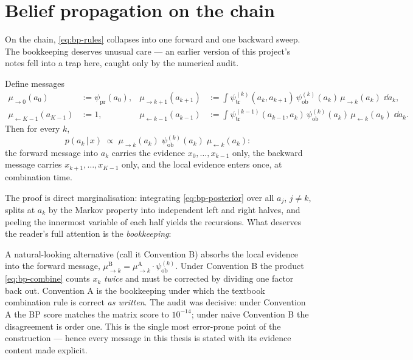 \section{Belief propagation on the chain}\label{sec:bp-chain}

On the chain, \eqref{eq:bp-rules} collapses into one forward and one
backward sweep. The bookkeeping deserves unusual care --- an earlier
version of this project's notes fell into a trap here, caught only by the
numerical audit.

\begin{proposition}[Convention A]\label{prop:bp-convA}
Define messages
\begin{align}
  \mu_{\to 0}(a_0) &:= \psi_{\mathrm{pr}}(a_0),
  &
  \mu_{\to k+1}(a_{k+1}) &:= \int
    \psi^{(k)}_{\mathrm{tr}}(a_k, a_{k+1})\,
    \psi^{(k)}_{\mathrm{ob}}(a_k)\,
    \mu_{\to k}(a_k)\; \dd a_k ,
  \label{eq:bp-fwd}\\
  \mu_{\leftarrow K-1}(a_{K-1}) &:= 1,
  &
  \mu_{\leftarrow k-1}(a_{k-1}) &:= \int
    \psi^{(k-1)}_{\mathrm{tr}}(a_{k-1}, a_k)\,
    \psi^{(k)}_{\mathrm{ob}}(a_k)\,
    \mu_{\leftarrow k}(a_k)\; \dd a_k .
  \label{eq:bp-bwd}
\end{align}
Then for every $k$,
\begin{equation}
  p(a_k \,|\, x) \;\propto\;
  \mu_{\to k}(a_k)\;
  \psi^{(k)}_{\mathrm{ob}}(a_k)\;
  \mu_{\leftarrow k}(a_k) :
  \label{eq:bp-combine}
\end{equation}
the forward message into $a_k$ carries the evidence $x_0, \dots, x_{k-1}$
only, the backward message carries $x_{k+1}, \dots, x_{K-1}$ only, and the
local evidence enters once, at combination time.
\end{proposition}

The proof is direct marginalisation: integrating \eqref{eq:bp-posterior}
over all $a_j$, $j \neq k$, splits at $a_k$ by the Markov property into
independent left and right halves, and peeling the innermost variable of
each half yields the recursions. What deserves the reader's full attention
is the \emph{bookkeeping}:

\begin{remark}\label{rmk:bp-trap}
A natural-looking alternative (call it Convention B) absorbs the local
evidence into the forward message,
$\mu^{\mathrm{B}}_{\to k} = \mu^{\mathrm{A}}_{\to k} \cdot
\psi^{(k)}_{\mathrm{ob}}$. Under Convention B the product
\eqref{eq:bp-combine} counts $x_k$ \emph{twice} and must be corrected by
dividing one factor back out. Convention A is the bookkeeping under which
the textbook combination rule is correct \emph{as written}. The audit was
decisive: under Convention A the BP score matches the matrix score to
$10^{-14}$; under naive Convention B the disagreement is order one. This is
the single most error-prone point of the construction --- hence every
message in this thesis is stated with its evidence content made explicit.
\end{remark}

